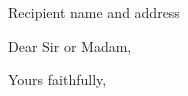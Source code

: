 \documentclass[a4paper,english,final]{letter}
\begin{document}
\begin{letter}{Recipient name and address}

\opening{Dear Sir or Madam,}


\closing{Yours faithfully,}

\end{letter}
\end{document}

